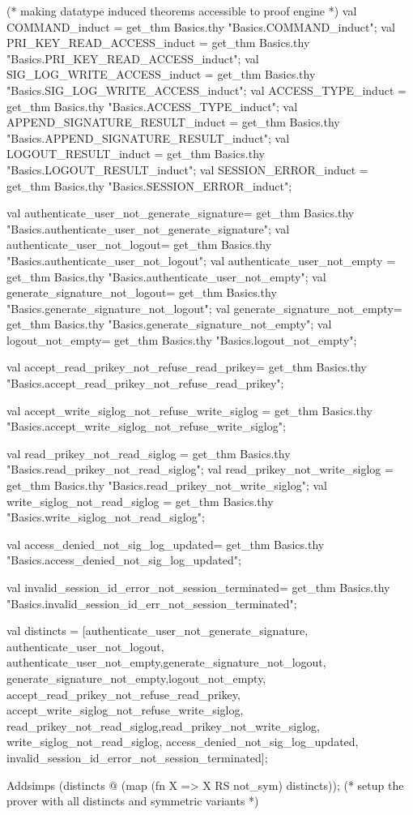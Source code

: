 \documentclass[a4paper,pdftex]{article}
\newenvironment{holz-ml}{\comment}{\endcomment}
\begin{document}
\begin{holz-ml}


(* making datatype induced theorems accessible to proof engine *)
val COMMAND_induct =     
    get_thm Basics.thy "Basics.COMMAND_induct";
val PRI_KEY_READ_ACCESS_induct = 
    get_thm Basics.thy "Basics.PRI_KEY_READ_ACCESS_induct";
val SIG_LOG_WRITE_ACCESS_induct = 
    get_thm Basics.thy "Basics.SIG_LOG_WRITE_ACCESS_induct";
val ACCESS_TYPE_induct = 
    get_thm Basics.thy "Basics.ACCESS_TYPE_induct";
val APPEND_SIGNATURE_RESULT_induct = 
    get_thm Basics.thy "Basics.APPEND_SIGNATURE_RESULT_induct";
val LOGOUT_RESULT_induct = 
    get_thm Basics.thy "Basics.LOGOUT_RESULT_induct";
val SESSION_ERROR_induct = 
    get_thm Basics.thy "Basics.SESSION_ERROR_induct";


val authenticate_user_not_generate_signature= 
    get_thm Basics.thy "Basics.authenticate_user_not_generate_signature";
val authenticate_user_not_logout= 
    get_thm Basics.thy "Basics.authenticate_user_not_logout";
val authenticate_user_not_empty = 
    get_thm Basics.thy "Basics.authenticate_user_not_empty";
val generate_signature_not_logout=
    get_thm Basics.thy "Basics.generate_signature_not_logout";
val generate_signature_not_empty= 
    get_thm Basics.thy "Basics.generate_signature_not_empty";
val logout_not_empty= 
    get_thm Basics.thy "Basics.logout_not_empty";


val accept_read_prikey_not_refuse_read_prikey= 
    get_thm Basics.thy "Basics.accept_read_prikey_not_refuse_read_prikey";


val accept_write_siglog_not_refuse_write_siglog = 
    get_thm Basics.thy "Basics.accept_write_siglog_not_refuse_write_siglog";


val read_prikey_not_read_siglog = 
    get_thm Basics.thy "Basics.read_prikey_not_read_siglog";
val read_prikey_not_write_siglog = 
    get_thm Basics.thy "Basics.read_prikey_not_write_siglog";
val write_siglog_not_read_siglog = 
    get_thm Basics.thy "Basics.write_siglog_not_read_siglog";

val access_denied_not_sig_log_updated= 
    get_thm Basics.thy "Basics.access_denied_not_sig_log_updated";

val invalid_session_id_error_not_session_terminated= 
    get_thm Basics.thy "Basics.invalid_session_id_err_not_session_terminated";

val distincts = [authenticate_user_not_generate_signature,
             authenticate_user_not_logout,
             authenticate_user_not_empty,generate_signature_not_logout,
             generate_signature_not_empty,logout_not_empty,
             accept_read_prikey_not_refuse_read_prikey,
             accept_write_siglog_not_refuse_write_siglog,
             read_prikey_not_read_siglog,read_prikey_not_write_siglog,
             write_siglog_not_read_siglog,
             access_denied_not_sig_log_updated,
             invalid_session_id_error_not_session_terminated];

Addsimps    (distincts @ (map (fn X => X RS not_sym) distincts));
(* setup the prover with all distincts and symmetric variants *)

\end{holz-ml}
\end{document}
